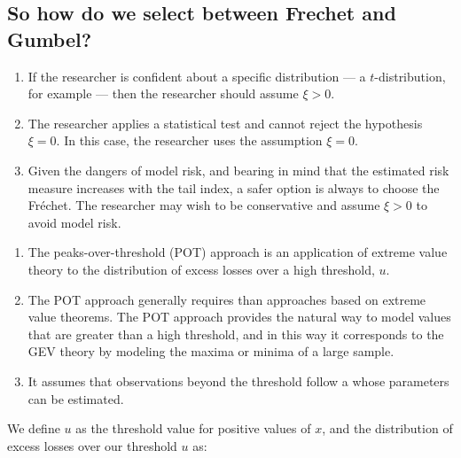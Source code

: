 \subsection{So how do we select between Frechet and Gumbel?}
\begin{enumerate}
\item {} If the researcher is confident about a
      specific distribution --- a $t$-distribution, for example --- then the researcher should
      assume $\xi > 0$.
\item {} The researcher applies a statistical test and cannot reject
      the hypothesis $\xi = 0$. In this case, the researcher uses the assumption $\xi = 0$.
\item {} Given the dangers of model risk, and bearing in mind that the
      estimated risk measure increases with the tail index, a safer option is always to choose
      the Fr\'echet. The researcher may wish to be conservative and assume $\xi > 0$ to avoid
      model risk.
\end{enumerate}


\begin{mrdefbox}[title={Peaks-over-threshold (POT)}]
\begin{enumerate}[label=\textbf{\alph*.}]
\item The peaks-over-threshold (POT) approach is an application of extreme value theory to the
      distribution of excess losses over a high threshold, $u$.
\item The POT approach generally requires  than approaches based on
      extreme value theorems. The POT approach provides the natural way to model values that
      are greater than a high threshold, and in this way it corresponds to the GEV theory by
      modeling the maxima or minima of a large sample.
\item It assumes that observations beyond the threshold follow a  whose parameters can be estimated.
\end{enumerate}
\end{mrdefbox}

We define $u$ as the threshold value for positive values of $x$, and the distribution of excess
losses over our threshold $u$ as:

